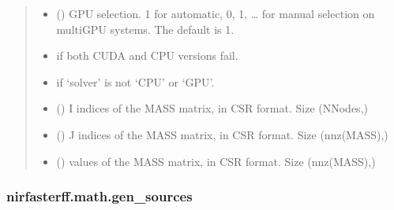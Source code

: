 \documentclass[letterpaper,10pt,english]{sphinxmanual}
\begin{document}
\begin{fulllineitems}
\begin{quote}
\begin{description}
\begin{itemize}
\item {} 
\sphinxAtStartPar
{} (\sphinxstyleliteralemphasis{\sphinxupquote{, }}) \textendash{} GPU selection. \sphinxhyphen{}1 for automatic, 0, 1, … for manual selection on multi\sphinxhyphen{}GPU systems. The default is \sphinxhyphen{}1.

\end{itemize}

\begin{itemize}
\item {} 
\sphinxAtStartPar
{} \textendash{} if both CUDA and CPU versions fail.

\item {} 
\sphinxAtStartPar
{} \textendash{} if ‘solver’ is not ‘CPU’ or ‘GPU’.

\end{itemize}

\sphinxAtStartPar
\begin{itemize}
\item {} 
\sphinxAtStartPar
{} () \textendash{} I indices of the MASS matrix, in CSR format. Size (NNodes,)

\item {} 
\sphinxAtStartPar
{} () \textendash{} J indices of the MASS matrix, in CSR format. Size (nnz(MASS),)

\item {} 
\sphinxAtStartPar
{} () \textendash{} values of the MASS matrix, in CSR format. Size (nnz(MASS),)

\end{itemize}


\end{description}\end{quote}

\end{fulllineitems}


\sphinxstepscope


\subsubsection{nirfasterff.math.gen\_sources}
\label{\detokenize{_autosummary/nirfasterff.math.gen_sources:nirfasterff-math-gen-sources}}\label{\detokenize{_autosummary/nirfasterff.math.gen_sources::doc}}
\end{document}
